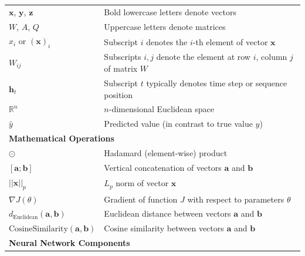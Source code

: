 \begin{appendices}
\begin{longtable}{p{}p{}}
    $\bm{x}$, $\bm{y}$, $\bm{z}$                & Bold lowercase letters denote vectors                                                \\
    $W$, $A$, $Q$                               & Uppercase letters denote matrices                                                    \\
    $x_i$ or $(\bm{x})_i$                       & Subscript $i$ denotes the $i$-th element of vector $\bm{x}$                          \\
    $W_{ij}$                                    & Subscripts $i,j$ denote the element at row $i$, column $j$ of matrix $W$             \\
    $\bm{h}_t$                                  & Subscript $t$ typically denotes time step or sequence position                       \\
    $\mathbb{R}^n$                              & $n$-dimensional Euclidean space                                                      \\
    $\hat{y}$                                   & Predicted value (in contrast to true value $y$)                                      \\
    \midrule
    \multicolumn{2}{l}{\textbf{Mathematical Operations}}                                                                               \\
    \midrule
    $\odot$                                     & Hadamard (element-wise) product                                                      \\
    $[\bm{a};\bm{b}]$                           & Vertical concatenation of vectors $\bm{a}$ and $\bm{b}$                              \\
    $||\bm{x}||_p$                              & $L_p$ norm of vector $\bm{x}$                                                        \\
    $\nabla J(\theta)$                          & Gradient of function $J$ with respect to parameters $\theta$                         \\
    $d_{\text{Euclidean}}(\bm{a},\bm{b})$       & Euclidean distance between vectors $\bm{a}$ and $\bm{b}$                             \\
    $\text{CosineSimilarity}(\bm{a},\bm{b})$    & Cosine similarity between vectors $\bm{a}$ and $\bm{b}$                              \\
    \midrule
    \multicolumn{2}{l}{\textbf{Neural Network Components}}                                                                             \\

\end{longtable}
\end{appendices}

